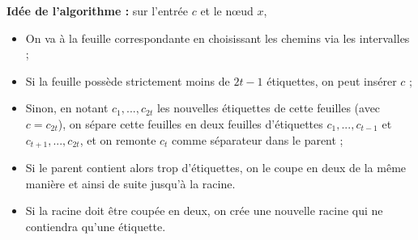 \textbf{Idée de l'algorithme :} sur l'entrée $c$ et le nœud $x$,
\begin{itemize}
\item On va à la feuille correspondante en choisissant les chemins via les intervalles ;
\item Si la feuille possède strictement moins de $2t-1$ étiquettes, on peut insérer $c$ ;
\item Sinon, en notant $c_1,...,c_{2t}$ les nouvelles étiquettes de cette feuilles (avec $c=c_{2t}$), on sépare cette feuilles en deux feuilles d'étiquettes $c_1,...,c_{t-1}$ et $c_{t+1},...,c_{2t}$, et on remonte $c_t$ comme séparateur dans le parent ;
\item Si le parent contient alors trop d'étiquettes, on le coupe en deux de la même manière et ainsi de suite jusqu'à la racine.
\item Si la racine doit être coupée en deux, on crée une nouvelle racine qui ne contiendra qu'une étiquette.
\end{itemize}
